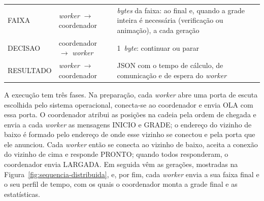 \begin{tabframed}[!htb]
\begin{tabular}{|l|l|p{8.6cm}|}
        FAIXA & \textit{worker} $\rightarrow$ coordenador & \textit{bytes} da faixa: ao final e, quando a grade inteira é necessária (verificação ou animação), a cada geração \\
        DECISAO & coordenador $\rightarrow$ \textit{worker} & 1~\textit{byte}: continuar ou parar \\
        RESULTADO & \textit{worker} $\rightarrow$ coordenador & JSON com o tempo de cálculo, de comunicação e de espera do \textit{worker} \\
        \hline
    \end{tabular}
    \fonte{}
\end{tabframed}

A execução tem três fases. Na preparação, cada \textit{worker} abre uma porta de escuta escolhida pelo sistema operacional, conecta-se ao coordenador e envia OLA com essa porta. O coordenador atribui as posições na cadeia pela ordem de chegada e envia a cada \textit{worker} as mensagens INICIO e GRADE; o endereço do vizinho de baixo é formado pelo endereço de onde esse vizinho se conectou e pela porta que ele anunciou. Cada \textit{worker} então se conecta ao vizinho de baixo, aceita a conexão do vizinho de cima e responde PRONTO; quando todos responderam, o coordenador envia LARGADA. Em seguida vêm as gerações, mostradas na Figura~\ref{fig:sequencia-distribuida}, e, por fim, cada \textit{worker} envia a sua faixa final e o seu perfil de tempo, com os quais o coordenador monta a grade final e as estatísticas.

